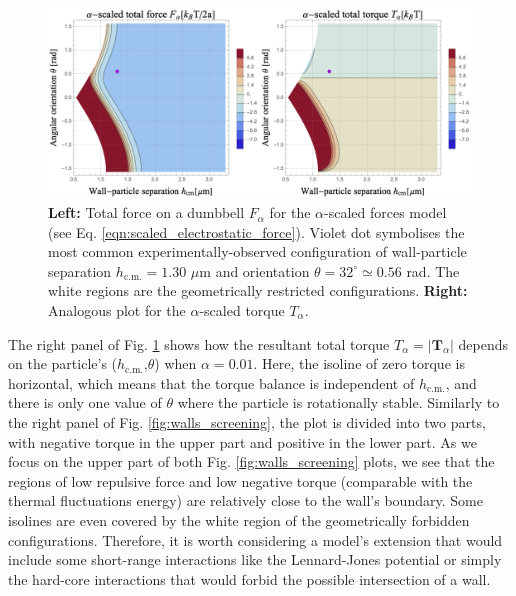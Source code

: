 \documentclass{master_thesis}
\begin{document}
\begin{figure}
    \centering
    \includegraphics[width=\linewidth]{figures/different_sterns_force_torque.png}
    \caption{\textbf{Left:} Total force on a dumbbell $F_{\alpha}$ for the $\alpha$-scaled forces model (see Eq. \eqref{eqn:scaled_electrostatic_force}). Violet dot symbolises the most common experimentally-observed configuration of wall-particle separation $h_{\textrm{c.m.}}=1.30$ $\mu$m and orientation $\theta=32^{\circ}\simeq 0.56$ rad. The white regions are the geometrically restricted configurations. \textbf{Right:} Analogous plot for the $\alpha$-scaled torque $T_{\alpha}$.}
    \label{fig:different_sterns_force_torque}
\end{figure}

The right panel of Fig. \ref{fig:different_sterns_force_torque} shows how the resultant total torque $T_{\alpha}=|\boldsymbol{T}_{\alpha}|$ depends on the particle's ($h_{\textrm{c.m.}}$,$\theta$) when $\alpha=0.01$. Here, the isoline of zero torque is horizontal, which means that the torque balance is independent of $h_{\textrm{c.m.}}$, and there is only one value of $\theta$ where the particle is rotationally stable.  Similarly to the right panel of Fig. \ref{fig:walls_screening}, the plot is divided into two parts, with negative torque in the upper part and positive in the lower part. As we focus on the upper part of both Fig. \ref{fig:walls_screening} plots, we see that the regions of low repulsive force and low negative torque (comparable with the thermal fluctuations energy) are relatively close to the wall's boundary. Some isolines are even covered by the white region of the geometrically forbidden configurations. Therefore, it is worth considering a model's extension that would include some short-range interactions like the Lennard-Jones potential or simply the hard-core interactions that would forbid the possible intersection of a wall.
\end{document}
